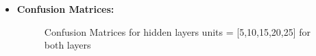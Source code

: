 \documentclass[a4 paper]{article}
\begin{document}
\begin{itemize}
\item \textbf{Confusion Matrices:}
\begin{figure}[H]
    \centering
    \qquad
  	\hspace*{-1.5cm}
    \caption{Confusion Matrices for hidden layers units = [5,10,15,20,25] for both layers}%
    \label{fig:example}%
\end{figure}
\end{itemize}
\end{document}
